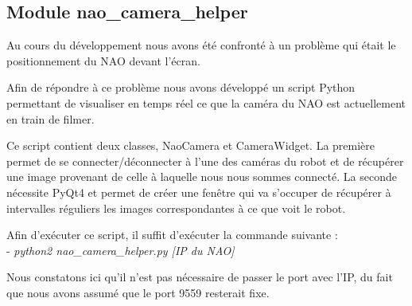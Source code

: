 \subsection{Module nao\_camera\_helper}
\label{sub:Module nao_camera_helper}
	\par Au cours du développement nous avons été confronté à un problème qui était le positionnement du NAO devant l'écran.
	\par Afin de répondre à ce problème nous avons développé un script Python permettant de visualiser en temps réel ce que la caméra du NAO est actuellement en train de filmer.
	\par Ce script contient deux classes, NaoCamera et CameraWidget.
	La première permet de se connecter/déconnecter à l'une des caméras du robot et de récupérer une image provenant de celle à laquelle nous nous sommes connecté.
	La seconde nécessite PyQt4 et permet de créer une fenêtre qui va s'occuper de récupérer à intervalles réguliers les images correspondantes à ce que voit le robot.
	\par Afin d'exécuter ce script, il suffit d'exécuter la commande suivante :\\
	- \textit{python2 nao\_camera\_helper.py [IP du NAO]}
	\par Nous constatons ici qu'il n'est pas nécessaire de passer le port avec l'IP, du fait que nous avons assumé que le port 9559 resterait fixe.
\pagebreak
